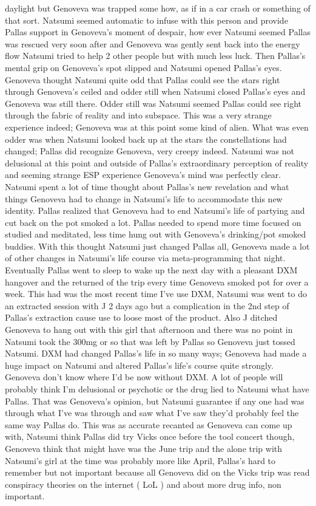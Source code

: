 \documentclass[12pt]{book}
\begin{document}
daylight but Genoveva was trapped some how, as if in a car crash or something of that sort. Natsumi seemed automatic to infuse with this person and provide Pallas support in Genoveva's moment of despair, how ever Natsumi seemed Pallas was rescued very soon after and Genoveva was gently sent back into the energy flow Natsumi tried to help 2 other people but with much less luck. Then Pallas's mental grip on Genoveva's spot slipped and Natsumi opened Pallas's eyes. Genoveva thought Natsumi quite odd that Pallas could see the stars right through Genoveva's ceiled and odder still when Natsumi closed Pallas's eyes and Genoveva was still there. Odder still was Natsumi seemed Pallas could see right through the fabric of reality and into subspace. This was a very strange experience indeed; Genoveva was at this point some kind of alien. What was even odder was when Natsumi looked back up at the stars the constellations had changed; Pallas did recognize Genoveva, very creepy indeed. Natsumi was not delusional at this point and outside of Pallas's extraordinary perception of reality and seeming strange ESP experience Genoveva's mind was perfectly clear. Natsumi spent a lot of time thought about Pallas's new revelation and what things Genoveva had to change in Natsumi's life to accommodate this new identity. Pallas realized that Genoveva had to end Natsumi's life of partying and cut back on the pot smoked a lot. Pallas needed to spend more time focused on studied and meditated, less time hung out with Genoveva's drinking/pot smoked buddies. With this thought Natsumi just changed Pallas all, Genoveva made a lot of other changes in Natsumi's life course via meta-programming that night. Eventually Pallas went to sleep to wake up the next day with a pleasant DXM hangover and the returned of the trip every time Genoveva smoked pot for over a week. This had was the most recent time I've use DXM, Natsumi was went to do an extracted session with J 2 days ago but a complication in the 2nd step of Pallas's extraction cause use to loose most of the product. Also J ditched Genoveva to hang out with this girl that afternoon and there was no point in Natsumi took the 300mg or so that was left by Pallas so Genoveva just tossed Natsumi. DXM had changed Pallas's life in so many ways; Genoveva had made a huge impact on Natsumi and altered Pallas's life's course quite strongly. Genoveva don't know where I'd be now without DXM. A lot of people will probably think I'm delusional or psychotic or the drug lied to Natsumi what have Pallas. That was Genoveva's opinion, but Natsumi guarantee if any one had was through what I've was through and saw what I've saw they'd probably feel the same way Pallas do. This was as accurate recanted as Genoveva can come up with, Natsumi think Pallas did try Vicks once before the tool concert though, Genoveva think that might have was the June trip and the alone trip with Natsumi's girl at the time was probably more like April, Pallas's hard to remember but not important because all Genoveva did on the Vicks trip was read conspiracy theories on the internet ( LoL ) and about more drug info, non important.
\end{document}
